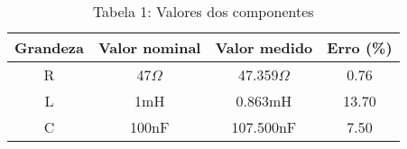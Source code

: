 \vspace{5pt}
\begin{table}[h]
\centering
\begin{tabular}{|c|c|c|c|}
\hline
\textbf{Grandeza} & \textbf{Valor nominal} & \textbf{Valor medido} & \textbf{Erro (\%) }\\\hline
R & 47$\Omega$ & 47.359$\Omega$ & 0.76 \\\hline 
L & 1mH & 0.863mH & 13.70 \\\hline 
C & 100nF & 107.500nF & 7.50 \\\hline 
\end{tabular}
\caption*{Tabela 1: Valores dos componentes}
\end{table}